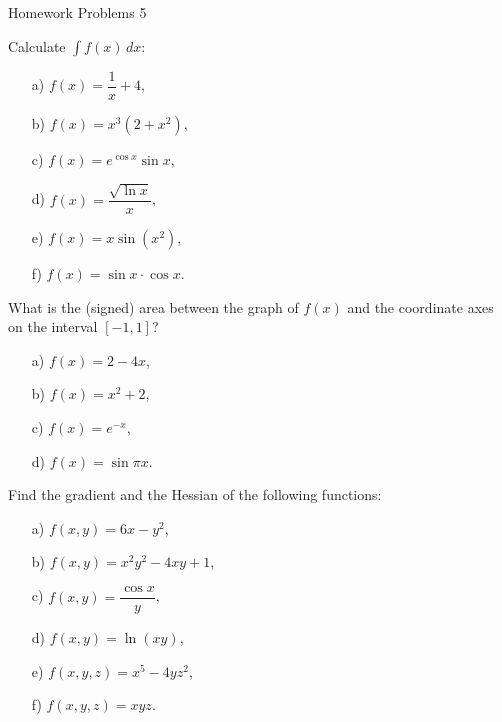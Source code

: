  \begin{center}\begin{large} Homework Problems 5
 \end{large}\end{center}
 \bigskip

\begin{problem}[2 points]
    Calculate $\displaystyle \int f(x)\,dx$:
     \begin{enumerate}
        \item[a) ] $f(x)=\dfrac{1}{x}+4$,
        \item[b) ] $f(x)=x^3(2+x^2)$,
        \item[c) ] $f(x)=e^{\cos x}\sin x$,
        \item[d) ] $f(x)=\dfrac{\sqrt{\ln x}}{x}$,
        \item[e) ] $f(x)=x\sin(x^2)$,
        \item[f) ] $f(x)=\sin x \cdot \cos x$.
     \end{enumerate}
\end{problem}
\bigskip

\begin{problem}[1 point]
What is the (signed) area between the graph of $f(x)$ and the coordinate axes on the interval $[-1,1]$?
\begin{enumerate}
        \item[a) ] $f(x)=2-4x$,
        \item[b) ] $f(x)=x^2+2$,
        \item[c) ] $f(x)=e^{-x}$,
        \item[d) ] $f(x)=\sin {\pi x}$.
    \end{enumerate}
\end{problem}

\bigskip


\begin{problem}[2 points]
Find the gradient and the Hessian of the following functions: 
    \begin{enumerate}
    \item[a) ] $f(x,y) = 6x-y^2$,
    \item[b) ] $f(x,y) = x^2 y^2 - 4xy + 1$,
    \item[c) ] $f(x,y) = \dfrac{\cos x}{y}$,
    \item[d) ] $f(x,y) = \ln(xy)$,
    \item[e) ] $f(x,y,z)=x^5 - 4yz^2$,
    \item[f) ] $f(x,y,z)=xyz$.
    \end{enumerate}
\end{problem}
\bigskip


